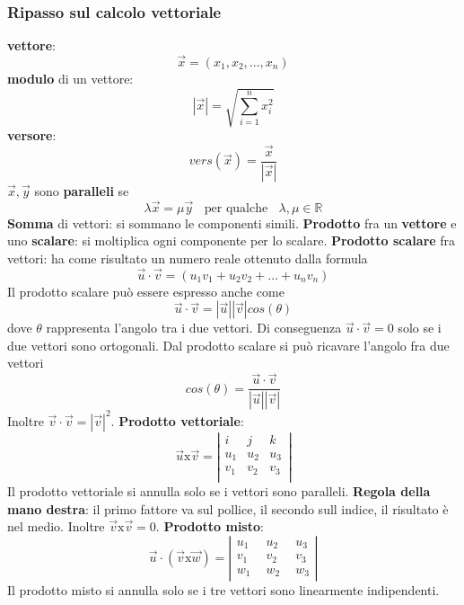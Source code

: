 \subsubsection{Ripasso sul calcolo vettoriale}
\textbf{vettore}:
\[
    \vec{x} = (x_1, x_2, \dots, x_n)
\]
\textbf{modulo} di un vettore:
\[
    |\vec{x}| = \sqrt{\sum_{i=1}^{n}x_i^2}
\]
\textbf{versore}:
\[
    vers(\vec{x}) = \frac{\vec{x}}{|\vec{x}|}
\]
$\vec{x}, \vec{y}$ sono \textbf{paralleli} se
\[
    \lambda \vec{x} = \mu \vec{y}\;\; \text{ per qualche } \;\;\lambda, \mu \in \mathbb{R}
\]
\textbf{Somma} di vettori: si sommano le componenti simili.\newline
\newline
\textbf{Prodotto} fra un \textbf{vettore} e uno \textbf{scalare}: si moltiplica ogni componente per lo scalare.\newline
\newline
\textbf{Prodotto scalare} fra vettori: ha come risultato un numero reale ottenuto dalla formula
\[
    \vec{u} \cdot \vec{v} = (u_1 v_1 + u_2 v_2 + \dots + u_n v_n)
\]
Il prodotto scalare può essere espresso anche come
\[
    \vec{u} \cdot \vec{v} = |\vec{u}| |\vec{v}| cos(\theta)
\]
dove $\theta$ rappresenta l'angolo tra i due vettori. Di conseguenza $\vec{u} \cdot  \vec{v} = 0$ solo se i due vettori sono ortogonali.\newline
Dal prodotto scalare si può ricavare l'angolo fra due vettori
\[
    cos(\theta) = \frac{\vec{u} \cdot  \vec{v} }{|\vec{u}| |\vec{v}|}
\]
Inoltre $\vec{v} \cdot  \vec{v} = |\vec{v}|^2$.\newline
\newline
\textbf{Prodotto vettoriale}:
\[
    \vec{u}\text{x}\vec{v} = \left|\begin{matrix}
        i \;\; & j \;\;& k \;\;\\
        u_1 & u_2 & u_3\\
        v_1 & v_2 & v_3\\
    \end{matrix}\right|
\]
Il prodotto vettoriale si annulla solo se i vettori sono paralleli.\newline
\textbf{Regola della mano destra}: il primo fattore va sul pollice, il secondo sull indice, il risultato è nel medio.\newline
Inoltre $\vec{v} \text{x} \vec{v} = 0$.\newline
\newline
\textbf{Prodotto misto}:
\[
    \vec{u} \cdot (\vec{v} \text{x} \vec{w}) = \left|\begin{matrix}
        u_1 \;\;& u_2 \;\;& u_3\\
        v_1 &v_2 & v_3\\
        w_1 &w_2 & w_3
    \end{matrix}\right|
\]
Il prodotto misto si annulla solo se i tre vettori sono linearmente indipendenti.

